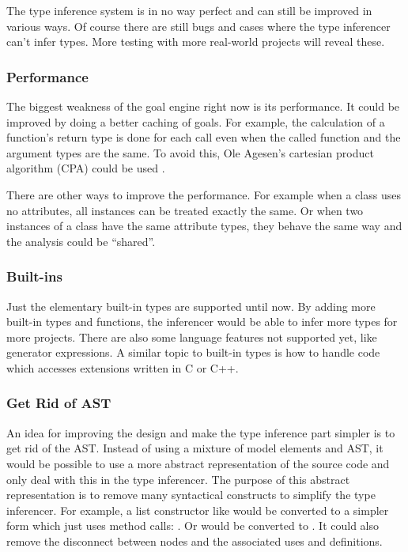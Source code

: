 \documentclass[12pt,halfparskip,DIV11,BCOR10mm]{scrreprt}
\begin{document}
The type inference system is in no way perfect and can still be improved in various ways. Of course there are still bugs and cases where the type inferencer can't infer types. More testing with more real-world projects will reveal these.

\subsubsection{Performance}

The biggest weakness of the goal engine right now is its performance. It could be improved by doing a better caching of goals. For example, the calculation of a function's return type is done for each call even when the called function and the argument types are the same. To avoid this, Ole Agesen's cartesian product algorithm (CPA) could be used \cite{cpa}.

There are other ways to improve the performance. For example when a class uses no attributes, all instances can be treated exactly the same. Or when two instances of a class have the same attribute types, they behave the same way and the analysis could be ``shared''.

\subsubsection{Built-ins}

Just the elementary built-in types are supported until now. By adding more built-in types and functions, the inferencer would be able to infer more types for more projects. There are also some language features not supported yet, like generator expressions. A similar topic to built-in types is how to handle code which accesses extensions written in C or C++.

\subsubsection{Get Rid of AST}
\label{aast}

An idea for improving the design and make the type inference part simpler is to get rid of the AST. Instead of using a mixture of model elements and AST, it would be possible to use a more abstract representation of the source code and only deal with this in the type inferencer. The purpose of this abstract representation is to remove many syntactical constructs to simplify the type inferencer. For example, a list constructor like  would be converted to a simpler form which just uses method calls: . Or  would be converted to . It could also remove the disconnect between  nodes and the associated uses and definitions.
\end{document}
